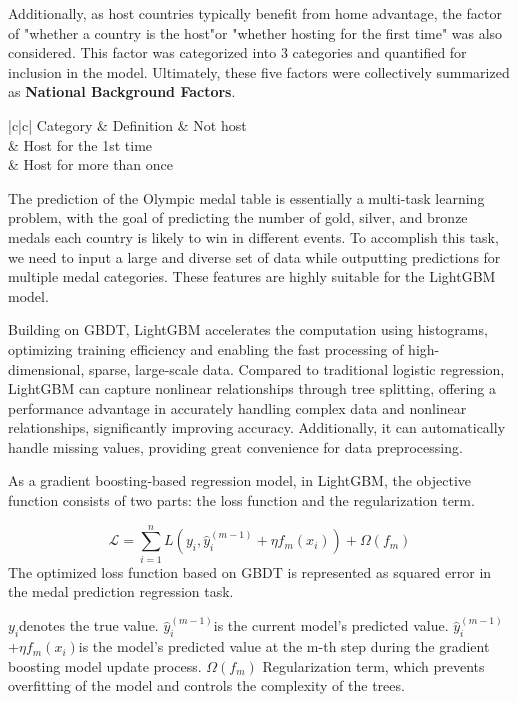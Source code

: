\documentclass[12pt]{article}  %
\begin{document}
Additionally, as host countries typically benefit from home advantage, the factor of "whether a country is the host"or "whether hosting for the first time" was also considered. This factor was categorized into 3 categories and quantified for inclusion in the model. Ultimately, these five factors were collectively summarized as \textbf{National Background Factors}.



\begin{longtable}{|c|c|} 
	\hline
	Category & Definition               \endfirsthead 
	        & Not host                 \\ 
	        & Host for the 1st time    \\ 
	        & Host for more than once  \\
	\hline
\end{longtable}

The prediction of the Olympic medal table is essentially a multi-task learning problem, with the goal of predicting the number of gold, silver, and bronze medals each country is likely to win in different events. To accomplish this task, we need to input a large and diverse set of data while outputting predictions for multiple medal categories. These features are highly suitable for the LightGBM model.

Building on GBDT, LightGBM accelerates the computation using histograms, optimizing training efficiency and enabling the fast processing of high-dimensional, sparse, large-scale data. Compared to traditional logistic regression, LightGBM can capture nonlinear relationships through tree splitting, offering a performance advantage in accurately handling complex data and nonlinear relationships, significantly improving accuracy. Additionally, it can automatically handle missing values, providing great convenience for data preprocessing.

As a gradient boosting-based regression model, in LightGBM, the objective function consists of two parts: the loss function and the regularization term.

\begin{equation}
	\mathcal{L} = \sum_{i=1}^{n} L(y_i, \hat{y}_i^{(m-1)} + \eta f_m(x_i)) + \Omega(f_m)
\end{equation}
The optimized loss function based on GBDT is represented as squared error in the medal prediction regression task.

$y_i$denotes the true value.
$\hat{y}_i^{(m-1)}$is the current model's predicted value.
$\hat{y}_i^{(m-1)}$+$\eta f_m(x_i)$is the model's predicted value at the m-th step during the gradient boosting model update process.
$\Omega(f_m)$ Regularization term, which prevents overfitting of the model and controls the complexity of the trees.
\end{document}
